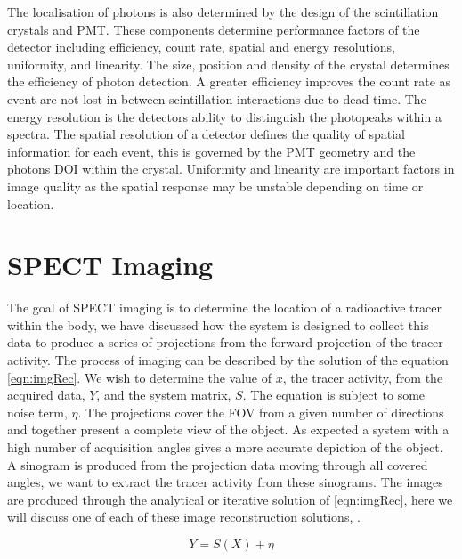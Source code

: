 The localisation of photons is also determined by the design of the scintillation crystals and \acrshort{PMT}. These components determine performance factors of the detector including efficiency, count rate, spatial and energy resolutions, uniformity, and linearity. The size, position and density of the crystal determines the efficiency of photon detection. A greater efficiency improves the count rate as event are not lost in between scintillation interactions due to dead time. The energy resolution is the detectors ability to distinguish the photopeaks within a spectra. The spatial resolution of a detector defines the quality of spatial information for each event, this is governed by the \acrshort{PMT} geometry and the photons \acrlong{DOI} within the crystal. Uniformity and linearity are important factors in image quality as the spatial response may be unstable depending on time or location.

\section{SPECT Imaging} %
The goal of SPECT imaging is to determine the location of a radioactive tracer within the body, we have discussed how the system is designed to collect this data to produce a series of projections from the forward projection of the tracer activity. The process of imaging can be described by the solution of the equation \ref{eqn:imgRec}. We wish to determine the value of $x$, the tracer activity, from the acquired data, $Y$, and the system matrix, $S$. The equation is subject to some noise term, $\eta$. The projections cover the FOV from a given number of directions and together present a complete view of the object. As expected a system with a high number of acquisition angles gives a more accurate depiction of the object. A sinogram is produced from the projection data moving through all covered angles, we want to extract the tracer activity from these sinograms. The images are produced through the analytical or iterative solution of \ref{eqn:imgRec}, here we will discuss one of each of these image reconstruction solutions, \cite{BasicOfNM}.

\begin{equation} \label{eqn:imgRec}
        Y = S(X) + \eta 
\end{equation}

